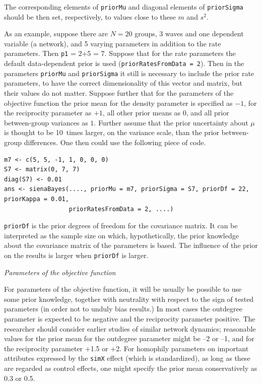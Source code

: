 \documentclass[a4paper,fleqn,11pt]{article}
\newcommand{\+}{\, + \,}
\newcommand{\SI}{{\sf SIENA }}
\begin{document}
The corresponding elements of \texttt{priorMu} and diagonal elements
of \texttt{priorSigma} should be then set, respectively, to values
close to these $m$ and $s^2$.

As an example, suppose there are $N = 20$ groups, 3 waves and one dependent
variable (a network), and 5 varying parameters in addition to the rate parameters.
Then \texttt{p1} = 2+5 = 7.
Suppose that for the rate parameters the default
data-dependent prior is used (\texttt{priorRatesFromData = 2}).
Then in the parameters \texttt{priorMu} and \texttt{priorSigma}
it still is necessary to include the prior rate parameters,
to have the correct dimensionality of this vector and matrix,
but their values do not matter.
Suppose further that for the parameters of the objective function
the prior mean for the density parameter is specified as $-1$,
for the reciprocity parameter as $+1$,
all other prior means as $0$, and all prior between-group variances as $1$.
Further assume that the prior uncertainty about $\mu$ is thought to be
10~times larger, on the variance scale, than the prior between-group differences.
One then could use the following piece of code.

{\small
\begin{verbatim}
m7 <- c(5, 5, -1, 1, 0, 0, 0)
S7 <- matrix(0, 7, 7)
diag(S7) <- 0.01
ans <- sienaBayes(...., priorMu = m7, priorSigma = S7, priorDf = 22, priorKappa = 0.01,
                  priorRatesFromData = 2, ....)
\end{verbatim}
}
\noindent
\texttt{priorDf} is the prior degrees of freedom for the
covariance matrix. It can be interpreted as the sample size on which,
hypothetically, the prior knowledge about the covariance matrix of the
parameters is based.
The influence of the prior on the results is larger when \texttt{priorDf}
is larger.
\medskip

\noindent
\emph{Parameters of the objective function}
\smallskip

\noindent
For parameters of the objective function, it will be usually be possible
to use some prior knowledge, together with neutrality with respect to
the sign of tested parameters (in order not to unduly bias results.)
In most cases the outdegree parameter is expected to be negative and
the reciprocity parameter positive. The researcher should consider
earlier studies of similar network dynamics; reasonable values for the
prior mean for the outdegree parameter might be --2 or --1, and for the
reciprocity parameter +1.5 or +2. For homophily parameters on important
attributes expressed by the \texttt{simX} effect (which is standardized),
as long as these are regarded as control effects, one might specify the
prior mean conservatively as 0.3 or 0.5.

\end{document}
